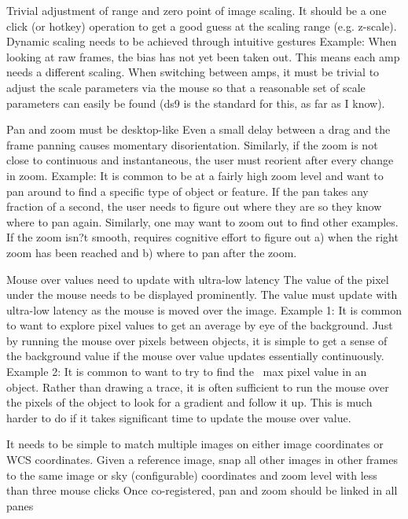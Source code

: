 \begin{itemize}

\item{Trivial adjustment of range and zero point of image scaling.
It should be a one click (or hotkey) operation to get a good guess at the scaling range (e.g. z-scale).
Dynamic scaling needs to be achieved through intuitive gestures
Example: When looking at raw frames, the bias has not yet been taken out.  This means each amp needs a different scaling.  When switching between amps, it must be trivial to adjust the scale parameters via the mouse so that a reasonable set of scale parameters can easily be found (ds9 is the standard for this, as far as I know).}
\item{Pan and zoom must be desktop-like
Even a small delay between a drag and the frame panning causes momentary disorientation.
Similarly, if the zoom is not close to continuous and instantaneous, the user must reorient after every change in zoom.
Example: It is common to be at a fairly high zoom level and want to pan around to find a specific type of object or feature.  If the pan takes any fraction of a second, the user needs to figure out where they are so they know where to pan again.  Similarly, one may want to zoom out to find other examples.  If the zoom isn?t smooth, requires cognitive effort to figure out a) when the right zoom has been reached and b) where to pan after the zoom.}
\item{Mouse over values need to update with ultra-low latency
The value of the pixel under the mouse needs to be displayed prominently.
The value must update with ultra-low latency  as the mouse is moved over the image.
Example 1: It is common to want to explore pixel values to get an average by eye of the background.  Just by running the mouse over pixels between objects, it is simple to get a sense of the background value if the mouse over value updates essentially continuously.
Example 2: It is common to want to try to find the ~max pixel value in an object.  Rather than drawing a trace, it is often sufficient to run the mouse over the pixels of the object to look for a gradient and follow it up.  This is much harder to do if it takes significant time to update the mouse over value.
\item{It needs to be simple to match multiple images on either image coordinates or WCS coordinates.}
Given a reference image, snap all other images in other frames to the same image or sky (configurable) coordinates and zoom level with less than three mouse clicks
Once co-registered, pan and zoom should be linked in all panes
}
\end{itemize}
